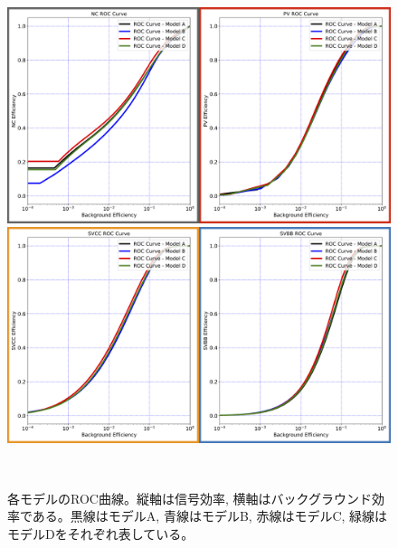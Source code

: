 \begin{figure}[htbp]
 \centering
  \begin{minipage}{1.0\textwidth}
   \centering
    \includegraphics[width=1.0\textwidth, clip]{Figure/3Networks/3-3-3-2ROC_Curve_1.png}
   \end{minipage}
   
   \begin{minipage}{1.0\textwidth}
   \centering
    \includegraphics[width=1.0\textwidth, clip]{Figure/3Networks/3-3-3-2ROC_Curve_2.png}
   \end{minipage} 
  \caption[各モデルのROC曲線]{各モデルのROC曲線。縦軸は信号効率, 横軸はバックグラウンド効率である。黒線はモデルA, 青線はモデルB, 赤線はモデルC, 緑線はモデルDをそれぞれ表している。}
\end{figure}
\addtocounter{figure}{-1}  
